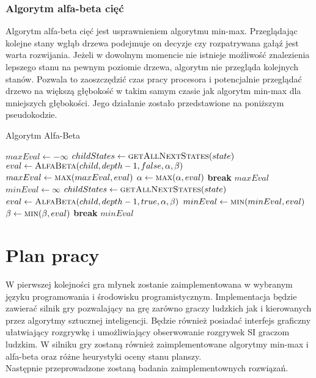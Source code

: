 \documentclass{article}
\begin{document}
	\subsubsection{Algorytm alfa-beta cięć}
	Algorytm alfa-beta cięć jest usprawnieniem algorytmu min-max. Przeglądając kolejne stany wgłąb drzewa podejmuje on decyzje czy rozpatrywana gałąź jest warta rozwijania. Jeżeli w dowolnym momencie nie istnieje możliwość znalezienia lepszego stanu na pewnym poziomie drzewa, algorytm nie przegląda kolejnych stanów. Pozwala to zaoszczędzić czas pracy procesora i potencjalnie przeglądać drzewo na większą głębokość w takim samym czasie jak algorytm min-max dla mniejszych głębokości. Jego działanie zostało przedstawione na poniższym pseudokodzie.
	\begin{algorithm}[H]
		\caption{Algorytm Alfa-Beta}
		\label{alg-alphabeta}
		\begin{algorithmic}[1]
					\State \Return {}
				\EndIf
					\State $maxEval \gets -\infty$
					\State $childStates \gets \Call{getAllNextStates}{state}$
						\State $eval \gets \Call{AlfaBeta}{child, depth-1, false, \alpha, \beta}$
						\State $maxEval \gets \Call{max}{maxEval, eval}$
						\State $\alpha \gets \Call{max}{\alpha, eval}$
						\If{$\alpha \geq \beta$}
							\State \textbf{break}
						\EndIf
					\EndFor
					\State \Return $maxEval$
				\Else
					\State $minEval \gets \infty$
					\State $childStates \gets \Call{getAllNextStates}{state}$
						\State $eval \gets \Call{AlfaBeta}{child, depth-1, true, \alpha, \beta}$
						\State $minEval \gets \Call{min}{minEval, eval}$
						\State $\beta \gets \Call{min}{\beta, eval}$
						\If{$\alpha \geq \beta$}
							\State \textbf{break}
						\EndIf
					\EndFor
					\State \Return $minEval$
				\EndIf
			\EndFunction
		\end{algorithmic}
	\end{algorithm}
	\section{Plan pracy}
	W pierwszej kolejności gra młynek zostanie zaimplementowana w wybranym języku programowania i środowisku programistycznym. Implementacja będzie zawierać silnik gry pozwalający na grę zarówno graczy ludzkich jak i kierowanych przez algorytmy sztucznej inteligencji. Będzie również posiadać interfejs graficzny ułatwiający rozgrywkę i umożliwiający obserwowanie rozgrywek SI graczom ludzkim. W silniku gry zostaną również zaimplementowane algorytmy min-max i alfa-beta oraz różne heurystyki oceny stanu planszy.\\
	Następnie przeprowadzone zostaną badania zaimplementownych rozwiązań.
\end{document}
